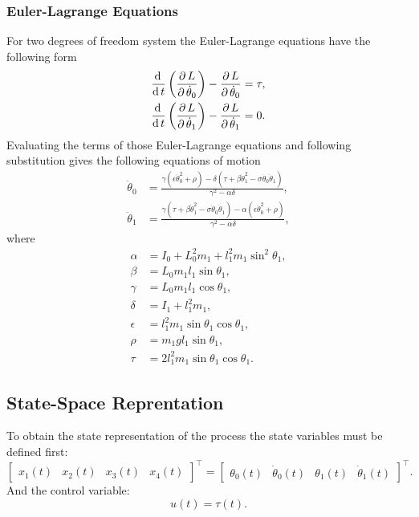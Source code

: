 \subsubsection{Euler-Lagrange Equations}
For two degrees of freedom system the Euler-Lagrange equations have the following form
\begin{subequations}
	\begin{align}
		\frac{\mathrm{d}\, }{\mathrm{d}\, t}\left( \frac{\partial\, L}{\partial\, \dot{\theta}_0} \right)-\frac{\partial\, L}{\partial\, \dot{\theta}_0} = \tau,\\
		\frac{\mathrm{d}\, }{\mathrm{d}\, t}\left( \frac{\partial\, L}{\partial\, \dot{\theta}_1} \right)-\frac{\partial\, L}{\partial\, \dot{\theta}_1} = 0.
	\end{align}
\end{subequations}
Evaluating the terms of those Euler-Lagrange equations and following substitution gives the following equations of motion
\begin{subequations}
	\begin{align}
	\ddot{\theta}_0 &= \frac{\gamma(\epsilon\dot{\theta}_0^2+\rho)-\delta(\tau+\beta\dot{\theta}_1^2-\sigma\dot{\theta}_0\dot{\theta}_1)}{\gamma^2-\alpha\delta}\label{motion1},\\
	\ddot{\theta}_1 &= \frac{\gamma(\tau+\beta\dot{\theta}_1^2-\sigma\dot{\theta}_0\dot{\theta}_1)-\alpha(\epsilon\dot{\theta}_0^2+\rho)}{\gamma^2-\alpha\delta}\label{motion2},
	\end{align}
\end{subequations}
where
\begin{subequations}
	\begin{align}
	\alpha &= I_0+L_0^2m_1+l_1^2m_1\sin^2\theta_1,\\
	\beta &= L_0m_1l_1\sin\theta_1, \\
	\gamma &= L_0m_1l_1\cos\theta_1,\\
	\delta &= I_1+l_1^2m_1,\\
	\epsilon &= l^2_1m_1\sin\theta_1\cos\theta_1,\\
	\rho &= m_1gl_1\sin\theta_1,\\
	\tau &= 2l^2_1m_1\sin\theta_1\cos\theta_1.
	\end{align}
\end{subequations}
\subsection{State-Space Reprentation} 
To obtain the state representation of the process the state variables must be defined first:
\begin{equation}
\begin{bmatrix}
x_1(t)&x_2(t)&x_3(t)&x_4(t)
\end{bmatrix}^\intercal = 
\begin{bmatrix}
\theta_0(t)&\dot{\theta}_0(t)&\theta_1(t)&\dot{\theta}_1(t)
\end{bmatrix}^\intercal.
\end{equation}
And the control variable:
\begin{equation} u(t) = \tau(t). \end{equation}
